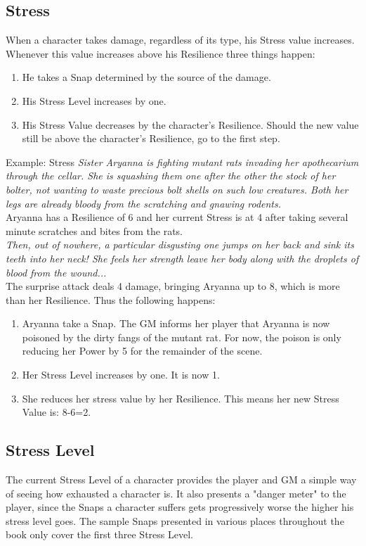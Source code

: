 \subsection{Stress}\label{Stress}
When a character takes damage, regardless of its type, his Stress value increases.
Whenever this value increases above his Resilience three things happen:
\begin{enumerate}
	\item He takes a Snap determined by the source of the damage.
	\item His Stress Level increases by one.
	\item His Stress Value decreases by the character's Resilience. Should the new value still be above the character's Resilience, go to the first step.
\end{enumerate}

\begin{DndSidebar}{Example: Stress}
\textit{Sister Aryanna is fighting mutant rats invading her apothecarium through the cellar. She is squashing them one after the other the stock of her bolter, not wanting to waste precious bolt shells on such low creatures. Both her legs are already bloody from the scratching and gnawing rodents.}\\
\noindent
Aryanna has a Resilience of 6 and her current Stress is at 4 after taking several minute scratches and bites from the rats.\\
\noindent
\textit{Then, out of nowhere, a particular disgusting one jumps on her back and sink its teeth into her neck! She feels her strength leave her body along with the droplets of blood from the wound...}\\
\noindent
The surprise attack deals 4 damage, bringing Aryanna up to 8, which is more than her Resilience. 
Thus the following happens:
\begin{enumerate}
	\item Aryanna take a Snap. The GM informs her player that Aryanna is now poisoned by the dirty fangs of the mutant rat. For now, the poison is only reducing her Power by 5 for the remainder of the scene.
	\item Her Stress Level increases by one. It is now 1.
	\item She reduces her stress value by her Resilience. This means her new Stress Value is: 8-6=2.
\end{enumerate}
\end{DndSidebar}

\subsection{Stress Level}\label{Stress_Level}
The current Stress Level of a character provides the player and GM a simple way of seeing how exhausted a character is.
It also presents a "danger meter" to the player, since the Snaps a character suffers gets progressively worse the higher his stress level goes.
The sample Snaps presented in various places throughout the book only cover the first three Stress Level.

